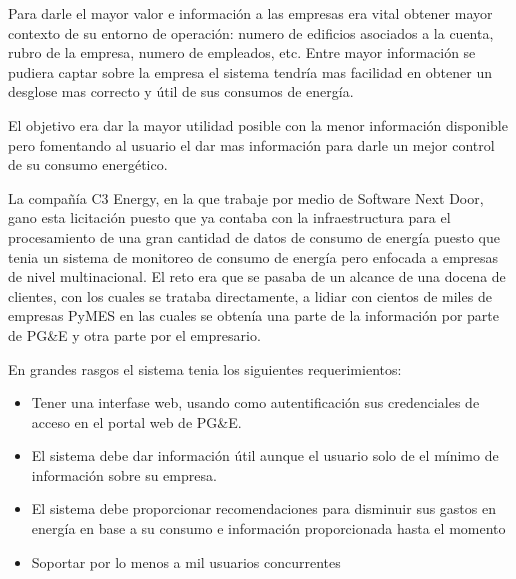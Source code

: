 \documentclass{article}
\begin{document}
Para darle el mayor valor e información a las empresas era
vital obtener mayor contexto de su entorno de operación: numero
de edificios asociados a la cuenta, rubro de la empresa, numero de
empleados, etc. Entre mayor información se pudiera captar sobre la
empresa el sistema tendría mas facilidad en obtener un desglose
mas correcto y útil de sus consumos de energía.

El objetivo era dar la mayor utilidad posible con la menor
información disponible pero fomentando al usuario el dar mas
información para darle un mejor control de su consumo energético.

La compañía C3 Energy, en la que trabaje por medio de Software Next Door,
gano esta licitación puesto que ya contaba con la infraestructura
para el procesamiento de una gran
cantidad de datos de consumo de energía puesto que tenia un sistema
de monitoreo de consumo de energía pero enfocada a empresas de nivel
multinacional. El reto era que se pasaba de un alcance de una docena
de clientes, con los cuales se trataba directamente, a lidiar con
cientos de miles de empresas PyMES en las cuales se obtenía una
parte de la información por parte de PG\&E y otra parte por el
empresario.

En grandes rasgos el sistema tenia los siguientes requerimientos:
\begin{itemize}
\item Tener una interfase web, usando como autentificación
  sus credenciales de acceso en el portal web de PG\&E.
\item El sistema debe dar información útil aunque el usuario solo de
  el mínimo de información sobre su empresa.
\item El sistema debe proporcionar recomendaciones para disminuir sus
  gastos en energía en base a su consumo e información proporcionada
  hasta el momento
\item Soportar por lo menos a mil usuarios concurrentes
\end{itemize}
\end{document}
